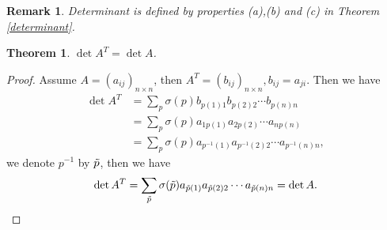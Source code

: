 \documentclass[10pt]{book}
\newtheorem{theorem}{Theorem}[chapter]
\newtheorem{remark}{Remark}[chapter]
\theoremstyle{definition}
\numberwithin{equation}{chapter}
\begin{document}
\begin{remark}
Determinant is defined by properties (a),(b) and (c) in Theorem \ref{determinant}.
\end{remark}

\medskip

\begin{theorem}
$\det A^T = \det A$.
\end{theorem}
\begin{proof}
Assume $A = (a_{ij})_{n\times n}$, then $A^T = (b_{ij})_{n\times n}, b_{ij} = a_{ji}$. Then we have 
\begin{align*}
    \det A^T & = \sum_p \sigma(p) b_{p(1)1} b_{p(2)2} \cdots b_{p(n)n} \\
    & = \sum_p \sigma(p) a_{1 p(1)} a_{2 p(2)} \cdots a_{n p(n)} \\
    & = \sum_p \sigma(p) a_{p^{-1}(1)} a_{p^{-1}(2) 2} \cdots a_{p^{-1}(n) n},
\end{align*}
we denote $p^{-1}$ by $\Tilde{p}$, then we have
\begin{align*}
    \det A^T = \sum_{\Tilde{p}} \sigma(\Tilde{p}) a_{\Tilde{p}(1)} a_{\Tilde{p}(2) 2} \cdots a_{\Tilde{p}(n) n} = \det A.
\end{align*}
\end{proof}

\medskip
\end{document}
